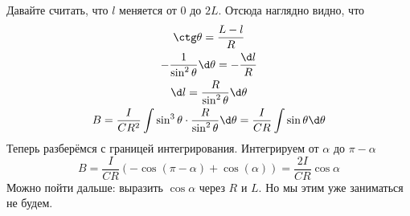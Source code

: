  Давайте считать, что $l$ меняется от $0$ до $2L$.
  Отсюда наглядно видно, что
  \begin{gather*}
    \ctg \theta = \frac{L-l}{R} \\
    - \frac 1 {\sin^2\theta} \d \theta = -\frac{\d l}{R} \\
   \d l = \frac{R}{\sin^2 \theta} \d \theta \\
    B = \frac{I}{CR^2} \int \sin^3 \theta \cdot \frac{R}{\sin^2 \theta} \d \theta
      = \frac{I}{CR} \int \sin \theta \d \theta
  \end{gather*}
  Теперь разберёмся с границей интегрирования.
  Интегрируем от $\alpha$ до $\pi-\alpha$
  \[ B = \frac{I}{CR} (-\cos(\pi-\alpha) + \cos(\alpha)) = \frac{2I}{CR} \cos \alpha\]
  Можно пойти дальше: выразить $\cos \alpha$ через $R$ и $L$.
  Но мы этим уже заниматься не будем.
